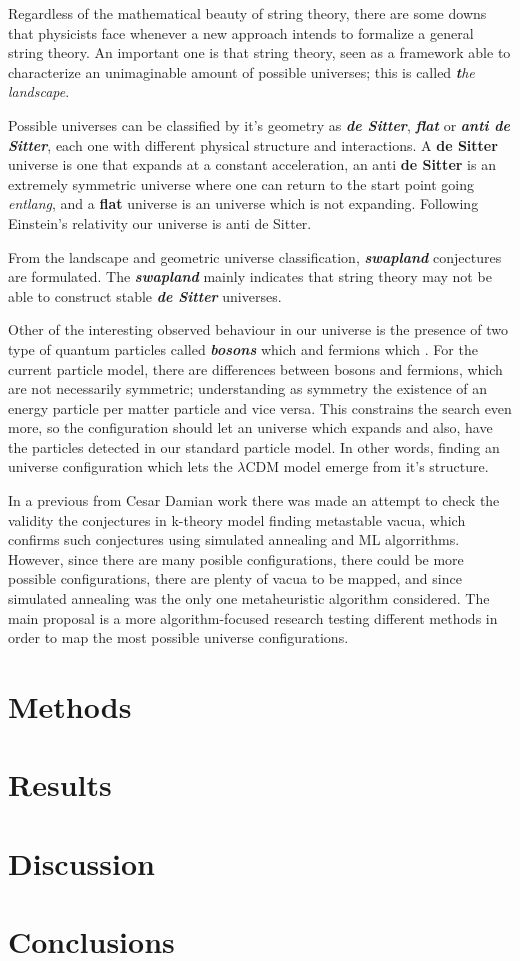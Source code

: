 \documentclass[pdflatex,lineno,sn-mathphys-num]{sn-jnl}
\begin{document}
Regardless of the mathematical beauty of string theory, there are some downs that physicists face whenever a new approach intends to formalize a general string theory. An important one is that string theory, seen as a framework able to characterize an unimaginable amount of possible universes; this is called \textit{\textbf the landscape}.

Possible universes can be classified by it's geometry as \textit{\textbf{de Sitter}}, \textit{\textbf{flat}} or \textit{\textbf{anti de Sitter}}, each one with different physical structure and interactions. A \textbf{de Sitter} universe is one that expands at a constant acceleration, an anti \textbf{de Sitter} is an extremely symmetric universe where one can return to the start point going \textit{entlang}, and a \textbf{flat} universe is an universe which is not expanding.
Following Einstein's relativity our universe is anti de Sitter.

From the landscape and geometric universe classification, \textit{\textbf{swapland}} conjectures are formulated. The \textit{\textbf{swapland}} mainly indicates that string theory may not be able to construct stable \textit{\textbf{de Sitter}} universes.

Other of the interesting observed behaviour in our universe is the presence of two type of quantum particles called \textbf{\textit{bosons}} which  and fermions which . For the current particle model, there are differences between bosons and fermions, which are not necessarily symmetric; understanding as symmetry the existence of an energy particle per matter particle and vice versa. This constrains the search even more, so the configuration should let an universe which expands and also, have the particles detected in our standard particle model. In other words, finding an universe configuration which lets the $\lambda$CDM model emerge from it's structure.

In a previous from Cesar Damian \cite{Damian2022} work there was made an attempt to check the validity the conjectures in k-theory model finding metastable vacua, which confirms such conjectures using simulated annealing and ML algorrithms. However, since there are many posible configurations, there could be more possible configurations, there are plenty of vacua to be mapped, and since simulated annealing was the only one metaheuristic algorithm considered. The main proposal is a more algorithm-focused research testing different methods in order to map the most possible universe configurations.


\section{Methods} \label{sec:methods}

\section{Results} \label{sec: results}

\section{Discussion} \label{sec: discussion}

\section{Conclusions} \label{sec: conclusions}



\end{document}
